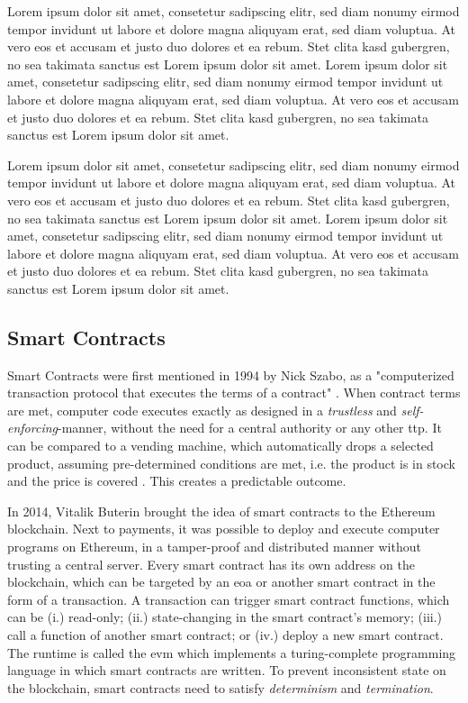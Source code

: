 Lorem ipsum dolor sit amet, consetetur sadipscing elitr, sed diam nonumy eirmod tempor invidunt ut labore et dolore magna aliquyam erat, sed diam voluptua. At vero eos et accusam et justo duo dolores et ea rebum. Stet clita kasd gubergren, no sea takimata sanctus est Lorem ipsum dolor sit amet. Lorem ipsum dolor sit amet, consetetur sadipscing elitr, sed diam nonumy eirmod tempor invidunt ut labore et dolore magna aliquyam erat, sed diam voluptua. At vero eos et accusam et justo duo dolores et ea rebum. Stet clita kasd gubergren, no sea takimata sanctus est Lorem ipsum dolor sit amet.

Lorem ipsum dolor sit amet, consetetur sadipscing elitr, sed diam nonumy eirmod tempor invidunt ut labore et dolore magna aliquyam erat, sed diam voluptua. At vero eos et accusam et justo duo dolores et ea rebum. Stet clita kasd gubergren, no sea takimata sanctus est Lorem ipsum dolor sit amet. Lorem ipsum dolor sit amet, consetetur sadipscing elitr, sed diam nonumy eirmod tempor invidunt ut labore et dolore magna aliquyam erat, sed diam voluptua. At vero eos et accusam et justo duo dolores et ea rebum. Stet clita kasd gubergren, no sea takimata sanctus est Lorem ipsum dolor sit amet.

\subsection{Smart Contracts}
\label{subsec:sc}

Smart Contracts were first mentioned in 1994 by Nick Szabo, as a "computerized transaction protocol that executes the terms of a contract" \cite{Szabo_1997}. When contract terms are met, computer code executes exactly as designed in a \emph{trustless} and \emph{self-enforcing}-manner, without the need for a central authority or any other \acrshort{ttp}. It can be compared to a vending machine, which automatically drops a selected product, assuming pre-determined conditions are met, i.e. the product is in stock and the price is covered \cite{Szabo_1997}. This creates a predictable outcome.

In 2014, Vitalik Buterin \cite{buterinNEXTGENERATIONSMART} brought the idea of smart contracts to the Ethereum blockchain. Next to payments, it was possible to deploy and execute computer programs on Ethereum, in a tamper-proof and distributed manner without trusting a central server. Every smart contract has its own address on the blockchain, which can be targeted by an \acrfull{eoa} or another smart contract in the form of a transaction. A transaction can trigger smart contract functions, which can be (i.) read-only; (ii.) state-changing in the smart contract's memory; (iii.) call a function of another smart contract; or (iv.) deploy a new smart contract. The runtime is called the \acrfull{evm} which implements a turing-complete programming language in which smart contracts are written. To prevent inconsistent state on the blockchain, smart contracts need to satisfy \emph{determinism} and \emph{termination}.

